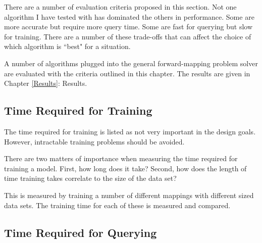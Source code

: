 There are a number of evaluation criteria proposed in this section.
Not one algorithm I have tested with \fw has dominated the others in performance.
Some are more accurate but require more query time.
Some are fast for querying but slow for training.
There are a number of these trade-offs that can affect the choice of which algorithm is ``best" for a situation.

A number of algorithms plugged into the general \fw forward-mapping problem solver are evaluated with the criteria outlined in this chapter.
The results are given in Chapter \ref{Results}: Results.


\subsection{Time Required for Training}

The time required for training is listed as not very important in the \fw design goals.
However, intractable training problems should be avoided.

There are two matters of importance when measuring the time required for training a model.
First, how long does it take?
Second, how does the length of time training takes correlate to the size of the data set?

This is measured by training a number of different mappings with different sized data sets.
The training time for each of these is measured and compared.


\subsection{Time Required for Querying}

